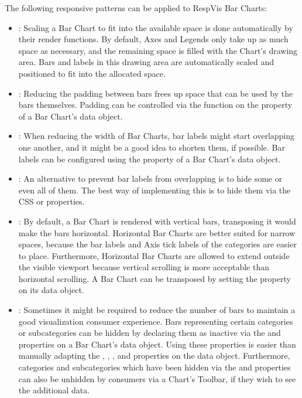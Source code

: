 The following responsive patterns can be applied to RespVis Bar Charts:
\begin{itemize}
\item {}: Scaling a Bar Chart to fit into the
  available space is done automatically by their render functions. By
  default, Axes and Legends only take up as much space as necessary,
  and the remaining space is filled with the Chart's drawing area. Bars
  and labels in this drawing area are automatically scaled and positioned
  to fit into the allocated space.

\item {}: Reducing the padding between bars
  frees up space that can be used by the bars themselves. Padding
  can be controlled via the  function on the
   property of a Bar Chart's data object.

\item {}: When reducing the width of Bar
  Charts, bar labels might start overlapping one another, and it might
  be a good idea to shorten them, if possible. Bar labels can be
  configured using the  property of a Bar Chart's data
  object.

\item {}: An alternative to prevent bar
  labels from overlapping is to hide some or even all of them. The
  best way of implementing this is to hide them via the CSS
   or  properties.

\item {}: By default, a Bar Chart is rendered
  with vertical bars, transposing it would make the bars horizontal.
  Horizontal Bar Charts are better suited for narrow spaces, because
  the bar labels and Axis tick labels of the categories are easier to
  place. Furthermore, Horizontal Bar Charts are allowed to extend
  outside the visible viewport because vertical scrolling is more
  acceptable than horizontal scrolling. A Bar Chart can be transposed
  by setting the  property on its data object.

\item {}: Sometimes it might be required to reduce
  the number of bars to maintain a good visualization consumer
  experience. Bars representing certain categories or subcategories
  can be hidden by declaring them as inactive via the
   and  properties on
  a Bar Chart's data object. Using these properties is easier than
  manually adapting the , ,
  , and  properties on the data
  object. Furthermore, categories and subcategories which have been
  hidden via the  and
   properties can also be unhidden by
  consumers via a Chart's Toolbar, if they wish to see the additional
  data.


\end{itemize}
